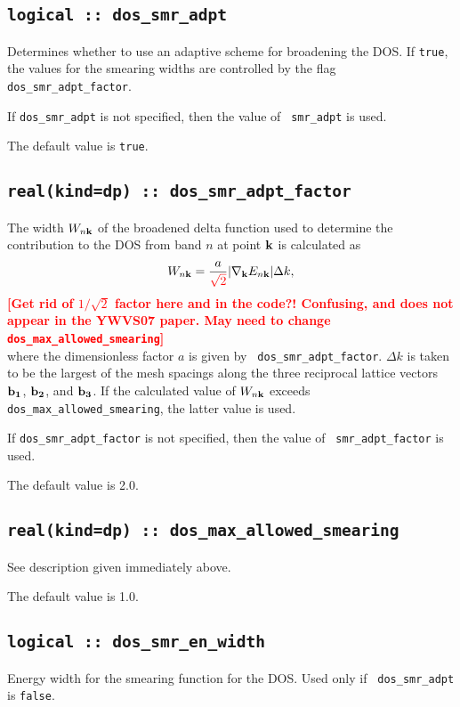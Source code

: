 \subsection[dos\_smr\_adaptive]{\tt logical :: dos\_smr\_adpt}
Determines whether to use an adaptive scheme for broadening the
DOS. If \verb#true#, the values for the smearing widths are 
controlled by the flag {\tt dos\_smr\_adpt\_factor}.

If {\tt dos\_smr\_adpt} is not specified, then the value of {\tt
  smr\_adpt} is used.  

The default value is \verb#true#.


\subsection[dos\_smr\_adaptive]{\tt real(kind=dp) :: dos\_smr\_adpt\_factor}

The width $W_{n{\bf k}}$ of the broadened delta function used to
determine the contribution to the DOS from band $n$ at point ${\bf k}$
is calculated as
%
$$
W_{n{\bf k}}=\frac{a}{\textcolor{red}{\sqrt{2}}}\vert
\nabla_{\bf k} E_{n{\bf k}}\vert \Delta k,
$$ 
%
\textcolor{red}{{\bf [Get rid of $1/\sqrt{2}$ factor here and in the code?! 
Confusing, and does not appear in the YWVS07 paper. May need to change
{\tt dos\_max\_allowed\_smearing}]}}\\
where the dimensionless factor $a$ is given by {\tt
  dos\_smr\_adpt\_factor}. $\Delta k$ is taken to be the largest of
the mesh spacings along the three reciprocal lattice vectors ${\bf
  b_1}$, ${\bf b_2}$, and ${\bf b_3}$.  If the calculated value of
$W_{n{\bf k}}$ exceeds {\tt dos\_max\_allowed\_smearing}, the latter
value is used.

If {\tt dos\_smr\_adpt\_factor} is not specified, then the value of {\tt
  smr\_adpt\_factor} is used.  

The default value is 2.0.


\subsection[dos\_smr\_adaptive]{\tt real(kind=dp) :: dos\_max\_allowed\_smearing}

See description given immediately above.

The default value is 1.0.

\subsection[dos\_smr\_en\_width]{\tt logical :: dos\_smr\_en\_width}
Energy width for the smearing function for the DOS. Used only if {\tt
  dos\_smr\_adpt} is \verb#false#.

